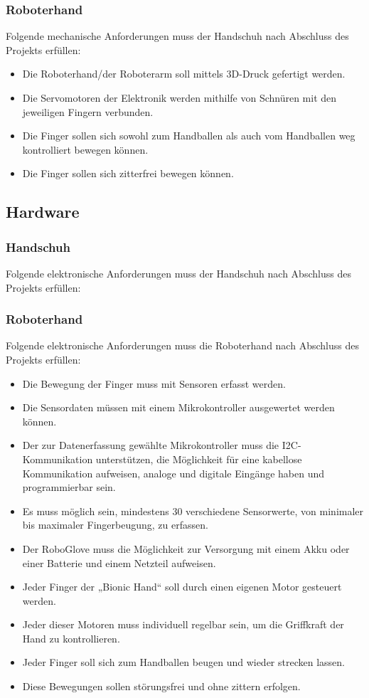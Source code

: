 \documentclass[11pt]{article}
\begin{document}
\subsubsection{Roboterhand}
Folgende mechanische Anforderungen muss der Handschuh nach Abschluss des Projekts erfüllen:

	\begin{itemize}
		\item Die Roboterhand/der Roboterarm soll mittels 3D-Druck gefertigt werden.
		\item Die Servomotoren der Elektronik werden mithilfe von Schnüren mit den jeweiligen Fingern verbunden.
		\item Die Finger sollen sich sowohl zum Handballen als auch vom Handballen weg kontrolliert bewegen können.
		\item Die Finger sollen sich zitterfrei bewegen können.
	\end{itemize}

\subsection{Hardware}
\subsubsection{Handschuh}
Folgende elektronische Anforderungen muss der Handschuh nach Abschluss des Projekts erfüllen:

\subsubsection{Roboterhand}
Folgende elektronische Anforderungen muss die Roboterhand nach Abschluss des Projekts erfüllen:

	\begin{itemize}
		\item Die Bewegung der Finger muss mit Sensoren erfasst werden.
		\item Die Sensordaten müssen mit einem Mikrokontroller ausgewertet werden können.
		\item Der zur Datenerfassung gewählte Mikrokontroller muss die I2C-Kommunikation unterstützen, die Möglichkeit
			  für eine kabellose Kommunikation aufweisen, analoge und digitale Eingänge haben und programmierbar sein. 
		\item Es muss möglich sein, mindestens 30 verschiedene Sensorwerte, von minimaler bis maximaler Fingerbeugung, 
		      zu erfassen.
		\item Der RoboGlove muss die Möglichkeit zur Versorgung mit einem Akku oder einer Batterie und einem Netzteil 
		      aufweisen. 
		\item Jeder Finger der „Bionic Hand“ soll durch einen eigenen Motor gesteuert werden.
		\item Jeder dieser Motoren muss individuell regelbar sein, um die Griffkraft der Hand zu kontrollieren.	
		\item Jeder Finger soll sich zum Handballen beugen und wieder strecken lassen.	
		\item Diese Bewegungen sollen störungsfrei und ohne zittern erfolgen.
	\end{itemize}
\end{document}
